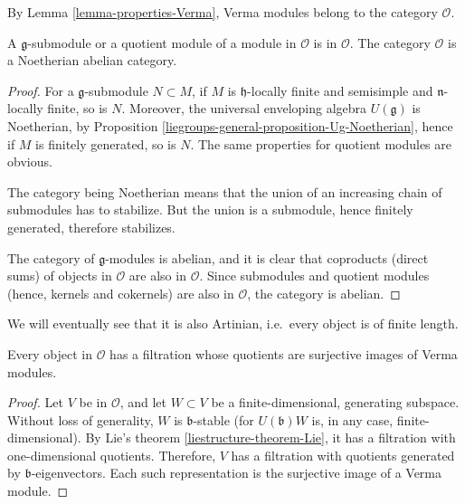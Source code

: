 By Lemma \ref{lemma-properties-Verma}, Verma modules belong to the category $\mathcal O$. 


\begin{lemma}
\label{lemma-O-properties}
A $\mathfrak g$-submodule or a quotient module of a module in $\mathcal O$ is in $\mathcal O$. The category $\mathcal O$ is a Noetherian abelian category.
\end{lemma}

\begin{proof}
For a $\mathfrak g$-submodule $N\subset M$, if $M$ is  $\mathfrak h$-locally finite and semisimple and $\mathfrak n$-locally finite, so is $N$. Moreover, the universal enveloping algebra $U(\mathfrak g)$ is Noetherian, by Proposition \ref{liegroups-general-proposition-Ug-Noetherian}, hence if $M$ is finitely generated, so is $N$. The same properties for quotient modules are obvious.

The category being Noetherian means that the union of an increasing chain of submodules has to stabilize. But the union is a submodule, hence finitely generated, therefore stabilizes.

The category of $\mathfrak g$-modules is abelian, and it is clear that coproducts (direct sums) of objects in $\mathcal O$ are also in $\mathcal O$. Since submodules and quotient modules (hence, kernels and cokernels) are also in $\mathcal O$, the category is abelian.
\end{proof}

We will eventually see that it is also Artinian, i.e.\ every object is of finite length.

\begin{lemma}
\label{lemma-filtration-Verma}
Every object in $\mathcal O$ has a filtration whose quotients are surjective images of Verma modules.
\end{lemma}

\begin{proof}
 Let $V$ be in $\mathcal O$, and let $W\subset V$ be a finite-dimensional, generating subspace. Without loss of generality, $W$ is $\mathfrak b$-stable (for $U(\mathfrak b)W$ is, in any case, finite-dimensional). By Lie's theorem \ref{liestructure-theorem-Lie}, it has a filtration with one-dimensional quotients. Therefore, $V$ has a filtration with quotients generated by $\mathfrak b$-eigenvectors. Each such representation is the surjective image of a Verma module.
\end{proof}




